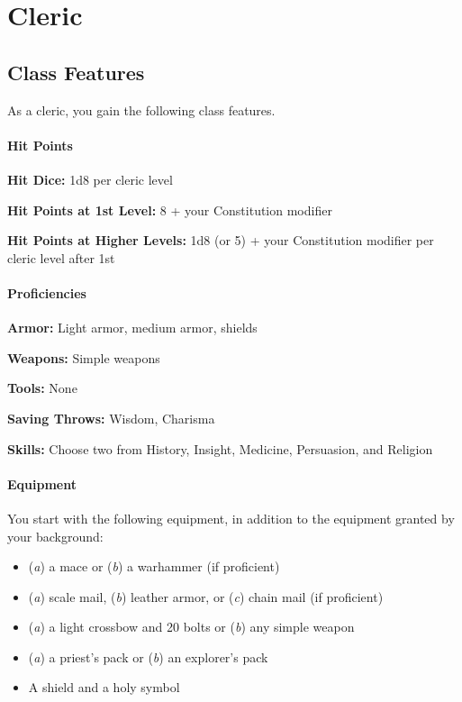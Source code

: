 \documentclass[
]{article}
\date{}
\providecommand{\tightlist}{%
  \setlength{\itemsep}{0pt}\setlength{\parskip}{0pt}}
\begin{document}
\hypertarget{cleric}{%
\section{Cleric}\label{cleric}}

\hypertarget{class-features}{%
\subsection{Class Features}\label{class-features}}

As a cleric, you gain the following class features.

\hypertarget{hit-points}{%
\paragraph{Hit Points}\label{hit-points}}

\textbf{Hit Dice:} 1d8 per cleric level

\textbf{Hit Points at 1st Level:} 8 + your Constitution modifier

\textbf{Hit Points at Higher Levels:} 1d8 (or 5) + your Constitution
modifier per cleric level after 1st

\hypertarget{proficiencies}{%
\paragraph{Proficiencies}\label{proficiencies}}

\textbf{Armor:} Light armor, medium armor, shields

\textbf{Weapons:} Simple weapons

\textbf{Tools:} None

\textbf{Saving Throws:} Wisdom, Charisma

\textbf{Skills:} Choose two from History, Insight, Medicine, Persuasion,
and Religion

\hypertarget{equipment}{%
\paragraph{Equipment}\label{equipment}}

You start with the following equipment, in addition to the equipment
granted by your background:

\begin{itemize}
\tightlist
\item
  (\emph{a}) a mace or (\emph{b}) a warhammer (if proficient)
\item
  (\emph{a}) scale mail, (\emph{b}) leather armor, or (\emph{c}) chain
  mail (if proficient)
\item
  (\emph{a}) a light crossbow and 20 bolts or (\emph{b}) any simple
  weapon
\item
  (\emph{a}) a priest's pack or (\emph{b}) an explorer's pack
\item
  A shield and a holy symbol
\end{itemize}
\end{document}
